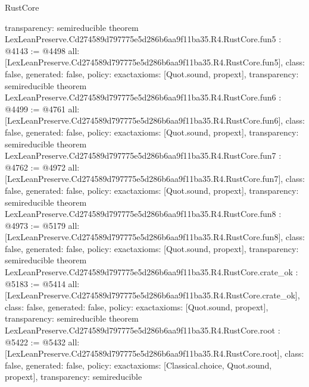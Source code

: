 \begin{lexlean}{RustCore}
\begin{coremodule}
{  transparency: semireducible
}
theorem LexLeanPreserve.Cd274589d797775e5d286b6aa9f11ba35.R4.RustCore.fun5 : @4143 := @4498 {
  all: [LexLeanPreserve.Cd274589d797775e5d286b6aa9f11ba35.R4.RustCore.fun5],
  class: false,
  generated: false,
  policy: exact{axioms: [Quot.sound, propext]},
  transparency: semireducible
}
theorem LexLeanPreserve.Cd274589d797775e5d286b6aa9f11ba35.R4.RustCore.fun6 : @4499 := @4761 {
  all: [LexLeanPreserve.Cd274589d797775e5d286b6aa9f11ba35.R4.RustCore.fun6],
  class: false,
  generated: false,
  policy: exact{axioms: [Quot.sound, propext]},
  transparency: semireducible
}
theorem LexLeanPreserve.Cd274589d797775e5d286b6aa9f11ba35.R4.RustCore.fun7 : @4762 := @4972 {
  all: [LexLeanPreserve.Cd274589d797775e5d286b6aa9f11ba35.R4.RustCore.fun7],
  class: false,
  generated: false,
  policy: exact{axioms: [Quot.sound, propext]},
  transparency: semireducible
}
theorem LexLeanPreserve.Cd274589d797775e5d286b6aa9f11ba35.R4.RustCore.fun8 : @4973 := @5179 {
  all: [LexLeanPreserve.Cd274589d797775e5d286b6aa9f11ba35.R4.RustCore.fun8],
  class: false,
  generated: false,
  policy: exact{axioms: [Quot.sound, propext]},
  transparency: semireducible
}
theorem LexLeanPreserve.Cd274589d797775e5d286b6aa9f11ba35.R4.RustCore.crate_ok : @5183 := @5414 {
  all: [LexLeanPreserve.Cd274589d797775e5d286b6aa9f11ba35.R4.RustCore.crate_ok],
  class: false,
  generated: false,
  policy: exact{axioms: [Quot.sound, propext]},
  transparency: semireducible
}
theorem LexLeanPreserve.Cd274589d797775e5d286b6aa9f11ba35.R4.RustCore.root : @5422 := @5432 {
  all: [LexLeanPreserve.Cd274589d797775e5d286b6aa9f11ba35.R4.RustCore.root],
  class: false,
  generated: false,
  policy: exact{axioms: [Classical.choice, Quot.sound, propext]},
  transparency: semireducible
}


\end{coremodule}
\end{lexlean}
